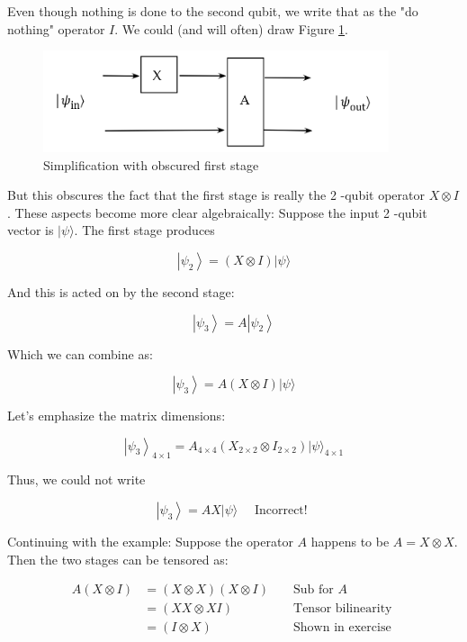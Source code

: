 \documentclass[main.tex]{subfiles}
\begin{document}
    Even though nothing is done to the second qubit, we write that as the "do nothing" operator $I$. We could (and will often) draw Figure \ref{fig:13unitary4}.
    
    \begin{figure}
        \centering
        \includegraphics[width=4in]{notes/figs/n07/13unitary4.png}
        \caption{Simplification with obscured first stage}
        \label{fig:13unitary4}
    \end{figure}
    
    But this obscures the fact that the first stage is really the 2 -qubit operator $X \otimes I$. These aspects become more clear algebraically: Suppose the input 2 -qubit vector is $|\psi\rangle$. The first stage produces
    
    $$
    \left|\psi_{2}\right\rangle=(X \otimes I)|\psi\rangle
    $$
    
    And this is acted on by the second stage:

    $$
    \left|\psi_{3}\right\rangle=A\left|\psi_{2}\right\rangle
    $$
    
    Which we can combine as:
    
    $$
    \left|\psi_{3}\right\rangle=A(X \otimes I)|\psi\rangle
    $$
    
    Let's emphasize the matrix dimensions:
    
    $$
    \left|\psi_{3}\right\rangle_{4 \times 1}=A_{4 \times 4}\left(X_{2 \times 2} \otimes I_{2 \times 2}\right)|\psi\rangle_{4 \times 1}
    $$
    
    Thus, we could not write
    
    $$
    \left|\psi_{3}\right\rangle=A X|\psi\rangle \quad \text { Incorrect! }
    $$
    
    Continuing with the example: Suppose the operator $A$ happens to be $A=X \otimes X$. Then the two stages can be tensored as:
    
    $$
    \begin{aligned}
    A(X \otimes I) &=(X \otimes X)(X \otimes I) & & \text { Sub for } A \\
    &=(X X \otimes X I) & & \text { Tensor bilinearity } \\
    &=(I \otimes X) & & \text { Shown in exercise }
    \end{aligned}
    $$
    
\end{document}
